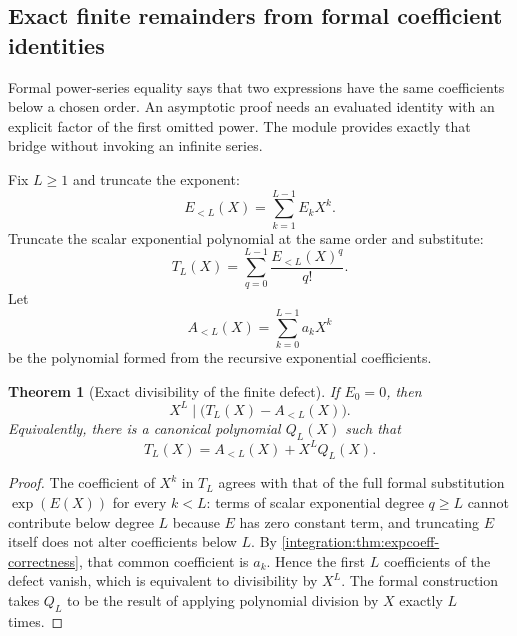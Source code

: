 \documentclass[11pt,oneside]{article}
\newtheorem{theorem}{Theorem}[section]
\theoremstyle{definition}
\theoremstyle{remark}
\begin{document}
\subsection{Exact finite remainders from formal coefficient identities}
\label{integration:sec:finite-remainder}

Formal power-series equality says that two expressions have the same coefficients below a
chosen order.  An asymptotic proof needs an evaluated identity with an explicit factor of the
first omitted power.  The module  provides exactly
that bridge without invoking an infinite series.

Fix $L\ge1$ and truncate the exponent:
\begin{equation}
 E_{<L}(X)=\sum_{k=1}^{L-1}E_kX^k.
 \label{integration:eq:exponent-trunc-polynomial}
\end{equation}
Truncate the scalar exponential polynomial at the same order and substitute:
\begin{equation}
 T_L(X)=\sum_{q=0}^{L-1}\frac{E_{<L}(X)^q}{q!}.
 \label{integration:eq:finite-exp-substitution}
\end{equation}
Let
\begin{equation}
 A_{<L}(X)=\sum_{k=0}^{L-1}a_kX^k
 \label{integration:eq:expcoeff-trunc-polynomial}
\end{equation}
be the polynomial formed from the recursive exponential coefficients.

\begin{theorem}[Exact divisibility of the finite defect]
\label{integration:thm:finite-defect-divisibility}
If $E_0=0$, then
\begin{equation}
 X^L\mid\bigl(T_L(X)-A_{<L}(X)\bigr).
 \label{integration:eq:defect-divisibility}
\end{equation}
Equivalently, there is a canonical polynomial $Q_L(X)$ such that
\begin{equation}
 T_L(X)=A_{<L}(X)+X^LQ_L(X).
 \label{integration:eq:exact-finite-remainder-polynomial}
\end{equation}
\end{theorem}

\begin{proof}
The coefficient of $X^k$ in $T_L$ agrees with that of the full formal substitution
$\exp(E(X))$ for every $k<L$: terms of scalar exponential degree $q\ge L$ cannot contribute
below degree $L$ because $E$ has zero constant term, and truncating $E$ itself does not alter
coefficients below $L$.  By \cref{integration:thm:expcoeff-correctness}, that common coefficient is
$a_k$.  Hence the first $L$ coefficients of the defect vanish, which is equivalent to
divisibility by $X^L$.  The formal construction takes $Q_L$ to be the result of applying
polynomial division by $X$ exactly $L$ times.
\end{proof}
\end{document}
